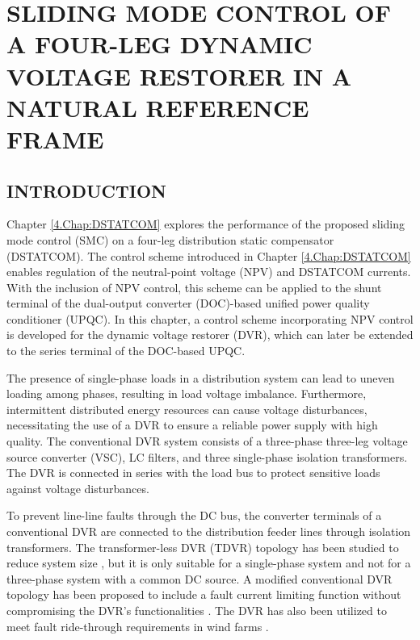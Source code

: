 \chapter{SLIDING MODE CONTROL OF A FOUR-LEG DYNAMIC VOLTAGE RESTORER IN A NATURAL REFERENCE FRAME}
\label{5.Chap:DVR}
\section{INTRODUCTION}
Chapter \ref{4.Chap:DSTATCOM} explores the performance of the proposed sliding mode control (SMC) on a four-leg distribution static compensator (DSTATCOM). The control scheme introduced in Chapter \ref{4.Chap:DSTATCOM} enables regulation of the neutral-point voltage (NPV) and DSTATCOM currents. With the inclusion of NPV control, this scheme can be applied to the shunt terminal of the dual-output converter (DOC)-based unified power quality conditioner (UPQC). In this chapter, a control scheme incorporating NPV control is developed for the dynamic voltage restorer (DVR), which can later be extended to the series terminal of the DOC-based UPQC.

The presence of single-phase loads in a distribution system can lead to uneven loading among phases, resulting in load voltage imbalance. Furthermore, intermittent distributed energy resources can cause voltage disturbances, necessitating the use of a DVR to ensure a reliable power supply with high quality. The conventional DVR system consists of a three-phase three-leg voltage source converter (VSC), LC filters, and three single-phase isolation transformers. The DVR is connected in series with the load bus to protect sensitive loads against voltage disturbances.

To prevent line-line faults through the DC bus, the converter terminals of a conventional DVR are connected to the distribution feeder lines through isolation transformers. The transformer-less DVR (TDVR) topology has been studied to reduce system size \cite{1308387,7776961}, but it is only suitable for a single-phase system and not for a three-phase system with a common DC source. A modified conventional DVR topology has been proposed to include a fault current limiting function without compromising the DVR's functionalities \cite{9324762,9219217}. The DVR has also been utilized to meet fault ride-through requirements in wind farms \cite{5665777,8533610}.

